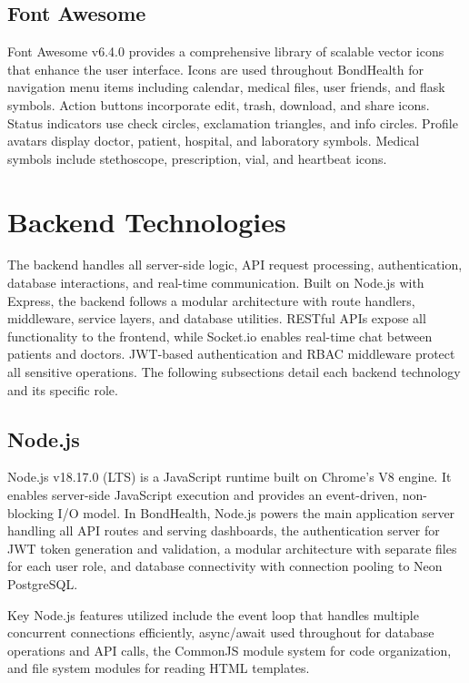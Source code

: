 \subsection{Font Awesome}

\justifying
\noindent Font Awesome v6.4.0 provides a comprehensive library of scalable vector icons that enhance the user interface. Icons are used throughout BondHealth for navigation menu items including calendar, medical files, user friends, and flask symbols. Action buttons incorporate edit, trash, download, and share icons. Status indicators use check circles, exclamation triangles, and info circles. Profile avatars display doctor, patient, hospital, and laboratory symbols. Medical symbols include stethoscope, prescription, vial, and heartbeat icons.

\section{Backend Technologies}

\justifying
\noindent The backend handles all server-side logic, API request processing, authentication, database interactions, and real-time communication. Built on Node.js with Express, the backend follows a modular architecture with route handlers, middleware, service layers, and database utilities. RESTful APIs expose all functionality to the frontend, while Socket.io enables real-time chat between patients and doctors. JWT-based authentication and RBAC middleware protect all sensitive operations. The following subsections detail each backend technology and its specific role.

\subsection{Node.js}

\justifying
\noindent Node.js v18.17.0 (LTS) is a JavaScript runtime built on Chrome's V8 engine. It enables server-side JavaScript execution and provides an event-driven, non-blocking I/O model. In BondHealth, Node.js powers the main application server handling all API routes and serving dashboards, the authentication server for JWT token generation and validation, a modular architecture with separate files for each user role, and database connectivity with connection pooling to Neon PostgreSQL.

\justifying
\noindent Key Node.js features utilized include the event loop that handles multiple concurrent connections efficiently, async/await used throughout for database operations and API calls, the CommonJS module system for code organization, and file system modules for reading HTML templates.

